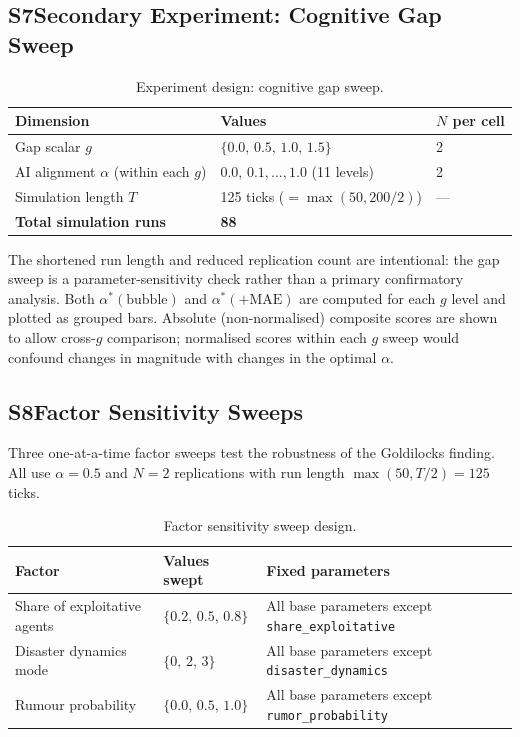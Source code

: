 \documentclass[pdflatex,sn-apa]{sn-jnl}%
\begin{document}
\begin{appendices}
\subsection*{S7\quad Secondary Experiment: Cognitive Gap Sweep}

\begin{table}[h]
\centering
\caption{Experiment design: cognitive gap sweep.}
\label{tab:S7}
\begin{tabular}{lll}
\toprule
Dimension & Values & $N$ per cell \\
\midrule
Gap scalar $g$               & $\{0.0,\,0.5,\,1.0,\,1.5\}$        & 2 \\
AI alignment $\alpha$ (within each $g$)
                             & $0.0,\,0.1,\ldots,1.0$ (11 levels)  & 2 \\
Simulation length $T$        & 125 ticks ($=\max(50,200/2)$)        & --- \\
\midrule
\textbf{Total simulation runs} & \multicolumn{2}{l}{\textbf{88}} \\
\bottomrule
\end{tabular}
\end{table}

The shortened run length and reduced replication count are intentional: the gap
sweep is a parameter-sensitivity check rather than a primary confirmatory
analysis.
Both $\alpha^*(\text{bubble})$ and $\alpha^*(+\mathrm{MAE})$ are computed for
each $g$ level and plotted as grouped bars.
Absolute (non-normalised) composite scores are shown to allow cross-$g$
comparison; normalised scores within each $g$ sweep would confound changes in
magnitude with changes in the optimal $\alpha$.

\subsection*{S8\quad Factor Sensitivity Sweeps}

Three one-at-a-time factor sweeps test the robustness of the Goldilocks finding.
All use $\alpha=0.5$ and $N=2$ replications with run length
$\max(50,T/2)=125$ ticks.

\begin{table}[h]
\centering
\caption{Factor sensitivity sweep design.}
\label{tab:S8}
\begin{tabular}{lll}
\toprule
Factor & Values swept & Fixed parameters \\
\midrule
Share of exploitative agents & $\{0.2,\,0.5,\,0.8\}$
  & All base parameters except \texttt{share\_exploitative} \\
Disaster dynamics mode & $\{0,\,2,\,3\}$
  & All base parameters except \texttt{disaster\_dynamics} \\
Rumour probability & $\{0.0,\,0.5,\,1.0\}$
  & All base parameters except \texttt{rumor\_probability} \\
\bottomrule
\end{tabular}
\end{table}


\end{appendices}
\end{document}
